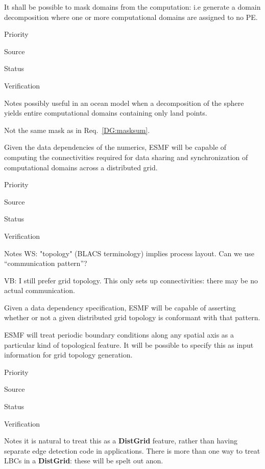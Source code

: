 \label{DG:masklayout}

It shall be possible to mask domains from the computation: i.e
generate a domain decomposition where one or more computational
domains are assigned to no PE.

\begin{reqlist}
\item[Priority]
\item[Source]
\item[Status]
\item[Verification]
\item[Notes] possibly useful in an ocean model when a decomposition
  of the sphere yields entire computational domains containing only
  land points.

  Not the same mask as in Req.~\ref{DG:masksum}.
\end{reqlist}


Given the data dependencies of the numerics, ESMF will be capable of
computing the connectivities required for data sharing and
synchronization of computational domains across a distributed grid.


\begin{reqlist}
\item[Priority]
\item[Source]
\item[Status]
\item[Verification]
\item[Notes] WS:  "topology" (BLACS terminology) implies process layout.
Can we use ``communication pattern''?

VB: I still prefer grid topology. This only sets up connectivities:
there may be no actual communication.

\end{reqlist}


Given a data dependency specification, ESMF will be capable of
asserting whether or not a given distributed grid topology is
conformant with that pattern.


ESMF will treat periodic boundary conditions along any spatial axis as
a particular kind of topological feature. It will be possible to
specify this as input information for grid topology generation.

\begin{reqlist}
\item[Priority]
\item[Source]
\item[Status]
\item[Verification]
\item[Notes] it is natural to treat this as a \textbf{DistGrid}
  feature, rather than having separate edge detection code in
  applications. There is more than one way to treat LBCs in a
  \textbf{DistGrid}: these will be spelt out anon.
\end{reqlist}

